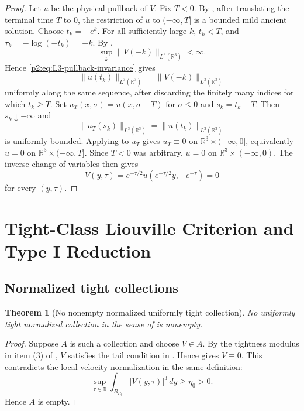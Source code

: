 \documentclass[11pt]{amsart}
\theoremstyle{plain}
\newtheorem{theorem}{Theorem}[section]
\theoremstyle{definition}
\theoremstyle{remark}
\numberwithin{equation}{section}
\newcommand{\R}{\mathbb R}
\begin{document}
\begin{proof}
Let \(u\) be the physical pullback of \(V\).  Fix \(T<0\).  By
, after translating the terminal time \(T\) to \(0\),
the restriction of \(u\) to \((-\infty,T]\) is a bounded mild ancient
solution.  Choose \(t_k=-e^k\).  For all sufficiently large \(k\), \(t_k<T\),
and \(\tau_k=-\log(-t_k)=-k\).  By
,
\[
   \sup_k\|V(-k)\|_{L^3(\R^3)}<\infty .
\]
Hence \eqref{p2:eq:L3-pullback-invariance} gives
\[
   \|u(t_k)\|_{L^3(\R^3)}
   =
   \|V(-k)\|_{L^3(\R^3)}
\]
uniformly along the same sequence, after discarding the finitely many indices
for which \(t_k\ge T\).
Set \(u_T(x,\sigma)=u(x,\sigma+T)\) for \(\sigma\le0\) and
\(s_k=t_k-T\).  Then \(s_k\downarrow-\infty\) and
\[
   \|u_T(s_k)\|_{L^3(\R^3)}
   =
   \|u(t_k)\|_{L^3(\R^3)}
\]
is uniformly bounded.  Applying  to \(u_T\) gives
\(u_T\equiv0\) on \(\R^3\times(-\infty,0]\), equivalently \(u=0\) on
\(\R^3\times(-\infty,T]\).  Since \(T<0\) was arbitrary, \(u=0\) on
\(\R^3\times(-\infty,0)\).  The inverse change of variables then gives
\[
   V(y,\tau)=e^{-\tau/2}u(e^{-\tau/2}y,-e^{-\tau})=0
\]
for every \((y,\tau)\).
\end{proof}

\section{Tight-Class Liouville Criterion and Type I Reduction}
\label{p2:sec:tight-liouville-interface}

\subsection{Normalized tight collections}

\begin{theorem}[No nonempty normalized uniformly tight collection]
\label{p2:thm:no-tight-normalized-collection}
No uniformly tight normalized collection in the sense of
 is nonempty.
\end{theorem}

\begin{proof}
Suppose \(A\) is such a collection and choose \(V\in A\).  By the tightness
modulus in item \textup{(3)} of , \(V\)
satisfies the tail condition in .  Hence
 gives \(V\equiv0\).  This contradicts the local
velocity normalization in the same definition:
\[
   \sup_{\tau\in\R}
   \int_{B_{R_0}}|V(y,\tau)|^3\,dy\ge\eta_0>0 .
\]
Hence \(A\) is empty.
\end{proof}
\end{document}
